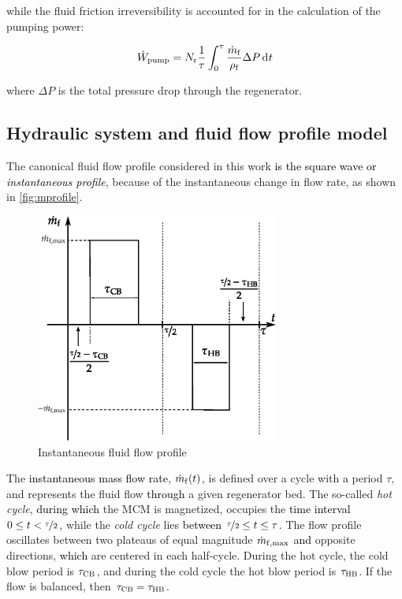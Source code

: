 \documentclass[referee]{svjour3}
\begin{document}
\noindent while the fluid friction irreversibility is accounted for in the calculation of the pumping power:

\begin{equation}
\label{eq:103}
\wpump = N\ped{r}\frac{1}{\tau}\int_0^{\tau}\frac{\rate{m}\ped{f}}{\rho\ped{f}} \Delta P \diffd{t}
\end{equation}

\noindent where $\Delta P$ is the total pressure drop through the regenerator.


\subsection{Hydraulic system  and fluid flow profile model}
\label{sec:hydr-syst-model}

The canonical fluid flow profile considered in this work \textcolor{black}{ is the square wave or \emph{instantaneous profile}}, because of the instantaneous change in flow rate, as shown in \autoref{fig:mprofile}. 

\begin{figure}[!ht]
  \centering
  \includegraphics[width=8cm]{mprofile}
  \caption{Instantaneous fluid flow profile}
  \label{fig:mprofile}
\end{figure}

The \textcolor{black}{instantaneous mass flow rate}, \(\dot{m}_{\mathrm{f}}(t)\), is defined over a cycle with \textcolor{black}{a} period \(\tau\), and represents the fluid flow \textcolor{black}{through} a given regenerator bed. The so-called \emph{hot cycle}, \textcolor{black}{during which} the MCM is magnetized, occupies the \textcolor{black}{time interval} \(0 \le t < \nicefrac{\tau}{2}\), while the \emph{cold cycle}
lies \textcolor{black}{between} \(\nicefrac{\tau}{2} \le t \le \tau\). The flow profile oscillates between two plateaus of equal magnitude
\(\dot{m}_{\mathrm{f,max}}\) \textcolor{black}{and} opposite directions, \textcolor{black}{which} are centered in each half-cycle. During the hot cycle, the cold
blow period is \(\tau_{\mathrm{CB}}\), and during the cold cycle the hot blow period is \(\tau_{\mathrm{HB}}\). If the flow is balanced, then \(\tau_{\mathrm{CB}} = \tau_{\mathrm{HB}}\).
\end{document}
